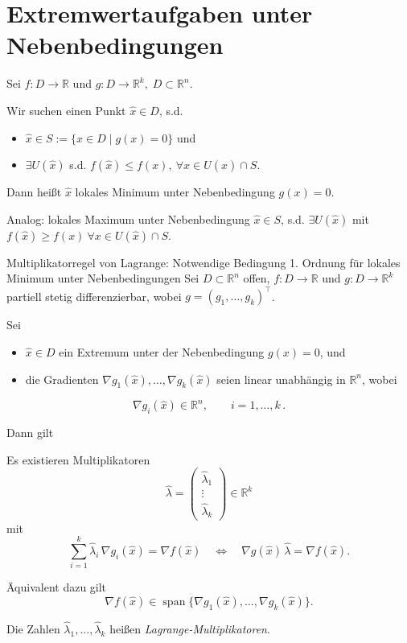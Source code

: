 \newpage
\section{Extremwertaufgaben unter Nebenbedingungen}
\label{4.7}

\begin{lemma}{}
    Sei $f: D\to\mathbb{R}$ und $g: D\to\mathbb{R}^k,\; D\subset\mathbb{R}^n.$

    Wir suchen einen Punkt $\hat{x}\in D$, s.d.
    \begin{itemize}
    \item $\hat{x}\in S:=\{x\in D\mid g(x)=0\}$ und
    \item $\exists U(\hat{x})$ s.d. $f(\hat{x})\le f(x),\ \forall x\in U(\hat{x})\cap S.$
    \end{itemize}

    Dann heißt $\hat{x}$ lokales Minimum unter Nebenbedingung $g(x)=0.$

    Analog: lokales Maximum unter Nebenbedingung $\hat{x}\in S$, s.d.
    $\exists U(\hat{x})$ mit $f(\hat{x})\ge f(x)\ \forall x\in U(\hat{x})\cap S.$
\end{lemma}

\begin{satz}{Multiplikatorregel von Lagrange: Notwendige Bedingung 1. Ordnung für lokales Minimum unter Nebenbedingungen}
    Sei $D\subset\mathbb{R}^n$ offen, $f:D\to\mathbb{R}$ und $g:D\to\mathbb{R}^k$ partiell stetig differenzierbar,
    wobei $g=(g_1,\dots,g_k)^\top$.

    Sei
    \begin{itemize} %
    \item $\hat x\in D$ ein Extremum unter der Nebenbedingung $g(x)=0$, und
    \item die Gradienten $\nabla g_1(\hat x),\dots,\nabla g_k(\hat x)$ seien linear unabhängig in $\mathbb{R}^n$, wobei
    \end{itemize}
    $$
    \nabla g_i(\hat x)\in\mathbb{R}^n,\qquad i=1,\dots,k \, .
    $$

    Dann gilt

    Es existieren Multiplikatoren
    $$
    \hat\lambda=
    \begin{pmatrix}
    \hat\lambda_1\\[4pt]
    \vdots\\[4pt]
    \hat\lambda_k
    \end{pmatrix}\in\mathbb{R}^k
    $$
    mit
    $$
    \sum_{i=1}^k \hat\lambda_i\,\nabla g_i(\hat x)=\nabla f(\hat x)
    \quad\Longleftrightarrow\quad
    \nabla g(\hat x)\,\hat\lambda=\nabla f(\hat x).
    $$

    Äquivalent dazu gilt
    $$
    \nabla f(\hat x)\in\operatorname{span}\{\nabla g_1(\hat x),\dots,\nabla g_k(\hat x)\}.
    $$

    Die Zahlen $\hat\lambda_1,\dots,\hat\lambda_k$ heißen \emph{Lagrange-Multiplikatoren}.
\end{satz}